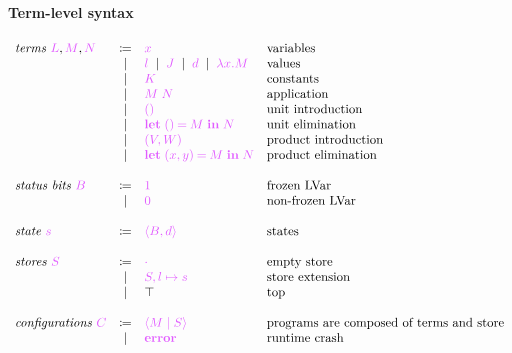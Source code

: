\documentclass[main.tex]{subfiles}
\begin{document}
\paragraph{Term-level syntax}
\[
\begin{array}{lcll}
  \textit{terms }\tm{L}, \tm{M}, \tm{N}
  & \coloneqq & \tm{x}                        & \text{variables} \\
  & \sep      & \tm{l} \sep \tm{J} \sep \tm{d} \sep \tm{\lambda x.M}
                                              & \text{values} \\
  & \sep      & \tm{K}                        & \text{constants} \\                                              
  & \sep      & \tm{M\;N}                     & \text{application} \\
  & \sep      & \tm{\unit}                    & \text{unit introduction} \\
  & \sep      & \tm{\letunit{M}{N}}           & \text{unit elimination} \\
  & \sep      & \tm{\pair{V}{W}}              & \text{product introduction} \\
  & \sep      & \tm{\letpair{x}{y}{M}{N}}     & \text{product elimination}\\
  \\
  \textit{status bits }\tm{B}
  & \coloneqq & \tm{1}                        & \text{frozen LVar} \\
  & \sep      & \tm{0}                        & \text{non-frozen LVar} \\
  \\
  \textit{state } \tm{s}
  & \coloneqq & \tm{\langle B, d \rangle}     & \text{states} \\
  \\
  \textit{stores } \tm{S}
  & \coloneqq & \tm{\emptyenv}                & \text{empty store} \\
  & \sep      & \tm{S, l \mapsto s}           & \text{store extension} \\
  & \sep      & \top                          & \text{top} \\
  \\
  \textit{configurations }\tm{C}
  & \coloneqq & \tm{\config{M}{S}}            & \text{programs are composed of
                                                    terms and store} \\
  & \sep      & \tm{\lvarerror}               & \text{runtime crash} \\
  \\

\end{array}\]
\end{document}
